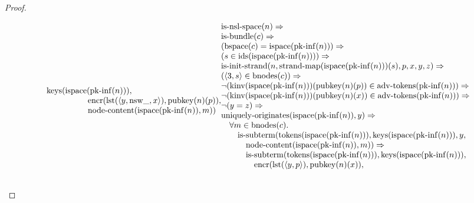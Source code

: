 \documentclass[11pt]{article}
\theoremstyle{plain}
\begin{document}
\begin{proof}
\begin{itemize}[leftmargin=2.8em, itemsep=4pt, parsep=1pt]
\begin{itemize}[leftmargin=2.8em, itemsep=4pt, parsep=1pt]
\begin{equation*}
\begin{array}{@{}l@{}}
\operatorname{keys}(\operatorname{ispace}(\operatorname{pk\text{-}inf}(n))), \\ \quad \quad \quad \quad \quad \operatorname{encr}(\operatorname{lst}(\langle y, \operatorname{nsw\_}, x \rangle), \operatorname{pubkey}(n)(p)), \\ \quad \quad \quad \quad \quad \operatorname{node\text{-}content}(\operatorname{ispace}(\operatorname{pk\text{-}inf}(n)), m)) \end{array} \\
\begin{array}{@{}l@{}} \operatorname{is\text{-}nsl\text{-}space}(n) \Rightarrow  \\ \operatorname{is\text{-}bundle}(c) \Rightarrow  \\ (\operatorname{bspace}(c) = \operatorname{ispace}(\operatorname{pk\text{-}inf}(n))) \Rightarrow  \\ (s \in \operatorname{ids}(\operatorname{ispace}(\operatorname{pk\text{-}inf}(n)))) \Rightarrow  \\ \operatorname{is\text{-}init\text{-}strand}(n, \operatorname{strand\text{-}map}(\operatorname{ispace}(\operatorname{pk\text{-}inf}(n)))(s), p, x, y, z) \Rightarrow  \\ (\langle 3, s \rangle \in \operatorname{bnodes}(c)) \Rightarrow  \\ \neg (\operatorname{kinv}(\operatorname{ispace}(\operatorname{pk\text{-}inf}(n)))(\operatorname{pubkey}(n)(p)) \in \operatorname{adv\text{-}tokens}(\operatorname{pk\text{-}inf}(n))) \Rightarrow  \\ \neg (\operatorname{kinv}(\operatorname{ispace}(\operatorname{pk\text{-}inf}(n)))(\operatorname{pubkey}(n)(x)) \in \operatorname{adv\text{-}tokens}(\operatorname{pk\text{-}inf}(n))) \Rightarrow  \\ \neg (y = z) \Rightarrow  \\ \operatorname{uniquely\text{-}originates}(\operatorname{ispace}(\operatorname{pk\text{-}inf}(n)), y) \Rightarrow  \\ \quad \forall m \in \operatorname{bnodes}(c). \\ \quad \quad \operatorname{is\text{-}subterm}(\operatorname{tokens}(\operatorname{ispace}(\operatorname{pk\text{-}inf}(n))), \operatorname{keys}(\operatorname{ispace}(\operatorname{pk\text{-}inf}(n))), y, \\ \quad \quad \quad \operatorname{node\text{-}content}(\operatorname{ispace}(\operatorname{pk\text{-}inf}(n)), m)) \Rightarrow \\ \quad \quad \quad \operatorname{is\text{-}subterm}(\operatorname{tokens}(\operatorname{ispace}(\operatorname{pk\text{-}inf}(n))), \operatorname{keys}(\operatorname{ispace}(\operatorname{pk\text{-}inf}(n))), \\ \quad \quad \quad \quad \operatorname{encr}(\operatorname{lst}(\langle y, p \rangle), \operatorname{pubkey}(n)(x)), \\ \quad \quad \quad \quad 
\end{array}
\end{equation*}
\end{itemize}
\end{itemize}
\end{proof}
\end{document}
